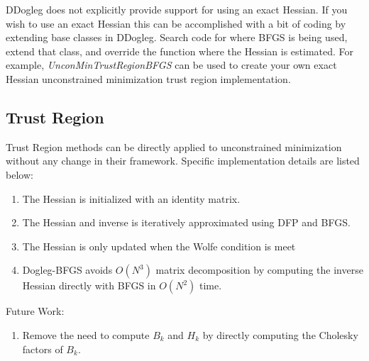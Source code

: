 \documentclass[peerreview,compsoc,onecolumn]{IEEEtran}
\newenvironment{enumargin}[1]{\begin{enumerate}[leftmargin=#1\textwidth , rightmargin=#1\textwidth]}{\end{enumerate}}
\begin{document}
DDogleg does not explicitly provide support for using an exact Hessian. If you wish to use an exact Hessian this can be accomplished with a bit of coding by extending base classes in DDogleg. Search code for where BFGS is being used, extend that class, and override the function where the Hessian is estimated. For example, \textit{UnconMinTrustRegionBFGS} can be used to create your own exact Hessian unconstrained minimization trust region implementation.

\subsection{Trust Region}
Trust Region methods can be directly applied to unconstrained minimization without any change in their framework. Specific implementation details are listed below:
\begin{enumargin}{0.2}
    \item The Hessian is initialized with an identity matrix. 
	\item The Hessian and inverse is iteratively approximated using DFP and BFGS.
	\item The Hessian is only updated when the Wolfe condition is meet
	\item Dogleg-BFGS avoids $O(N^3)$ matrix decomposition by computing the inverse Hessian directly with BFGS in $O(N^2)$ time.
\end{enumargin}

Future Work:
\begin{enumargin}{0.2}
	\item Remove the need to compute $B_k$ and $H_k$ by directly computing the Cholesky factors of $B_k$. 
\end{enumargin}
\end{document}
